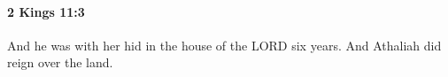 
		\paragraph{2 Kings 11:3} %
			\label{2KINGS-11-3}

			And he was with her hid in the house of the LORD six years. And Athaliah did reign over the land.


